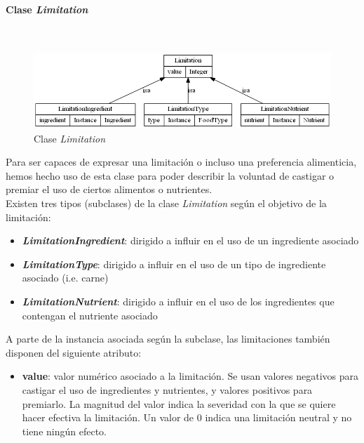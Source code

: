 \documentclass[11]{article}
\begin{document}
\paragraph{Clase \emph{Limitation}}\mbox{}\\
\begin{figure}[H]
\centering
\includegraphics[scale=0.5]{images/class_Limitation.png}
\caption{Clase \emph{Limitation}}
\label{fig_class_Limitation}
\end{figure}

Para ser capaces de expresar una limitación o incluso una preferencia alimenticia, hemos hecho uso de esta clase para poder describir la voluntad de castigar o premiar el uso de ciertos alimentos o nutrientes.
\\

Existen tres tipos (subclases) de la clase \emph{Limitation} según el objetivo de la limitación:
\begin{itemize}
\item \emph{\textbf{LimitationIngredient}}: dirigido a influir en el uso de un ingrediente asociado
\item \emph{\textbf{LimitationType}}: dirigido a influir en el uso de un tipo de ingrediente asociado (i.e. carne)
\item \emph{\textbf{LimitationNutrient}}: dirigido a influir en el uso de los ingredientes que contengan el nutriente asociado

\end{itemize}

A parte de la instancia asociada según la subclase, las limitaciones también disponen del siguiente atributo:
\begin{itemize}
\item \textbf{value}: valor numérico asociado a la limitación. Se usan valores negativos para castigar el uso de ingredientes y nutrientes, y valores positivos para premiarlo. La magnitud del valor indica la severidad con la que se quiere hacer efectiva la limitación. Un valor de 0 indica una limitación neutral y no tiene ningún efecto. 
\end{itemize}
\end{document}
